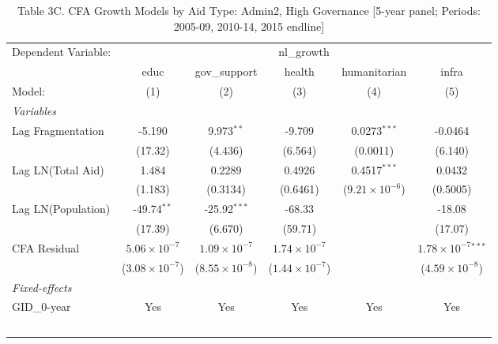 \begin{table}[H]
   \caption{Table 3C. CFA Growth Models by Aid Type: Admin2, High Governance [5-year panel; Periods: 2005-09, 2010-14, 2015 endline]}
   \centering
   \begin{tabular}{lccccc}
      \tabularnewline \midrule \midrule
      Dependent Variable: & \multicolumn{5}{c}{nl\_growth}\\
                         & educ                    & gov\_support            & health                  & humanitarian            & infra \\   
      Model:             & (1)                     & (2)                     & (3)                     & (4)                     & (5)\\  
      \midrule
      \emph{Variables}\\
      Lag Fragmentation  & -5.190                  & 9.973$^{**}$            & -9.709                  & 0.0273$^{***}$          & -0.0464\\   
                         & (17.32)                 & (4.436)                 & (6.564)                 & (0.0011)                & (6.140)\\   
      Lag LN(Total Aid)  & 1.484                   & 0.2289                  & 0.4926                  & 0.4517$^{***}$          & 0.0432\\   
                         & (1.183)                 & (0.3134)                & (0.6461)                & ($9.21\times 10^{-6}$)  & (0.5005)\\   
      Lag LN(Population) & -49.74$^{**}$           & -25.92$^{***}$          & -68.33                  &                         & -18.08\\   
                         & (17.39)                 & (6.670)                 & (59.71)                 &                         & (17.07)\\   
      CFA Residual       & $5.06\times 10^{-7}$    & $1.09\times 10^{-7}$    & $1.74\times 10^{-7}$    &                         & $1.78\times 10^{-7}$$^{***}$\\    
                         & ($3.08\times 10^{-7}$)  & ($8.55\times 10^{-8}$)  & ($1.44\times 10^{-7}$)  &                         & ($4.59\times 10^{-8}$)\\    
      \midrule
      \emph{Fixed-effects}\\
      GID\_0-year        & Yes                     & Yes                     & Yes                     & Yes                     & Yes\\  
$$
\end{tabular}
\end{table}
